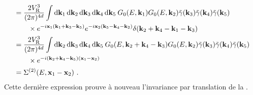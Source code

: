 \begin{align}
&=\frac{2V_{\mathrm{R}}^3}{(2\pi)^{4d}} \int{\mathop{}\mathopen{}\mathrm{d}\mathbf{k}_{\mathrm{1}}\mathop{}\mathopen{}\mathrm{d}\mathbf{k}_{\mathrm{2}}\mathop{}\mathopen{}\mathrm{d}\mathbf{k}_{\mathrm{3}}\mathop{}\mathopen{}\mathrm{d}\mathbf{k}_{\mathrm{4}}\mathop{}\mathopen{}\mathrm{d}\mathbf{k}_{\mathrm{5}}\: G_0(E,\mathbf{k}_{\mathrm{1}}) G_0(E,\mathbf{k}_{\mathrm{2}}) \tilde{\gamma}(\mathbf{k}_{\mathrm{3}})\tilde{\gamma}(\mathbf{k}_{\mathrm{4}})\tilde{\gamma}(\mathbf{k}_{\mathrm{5}})}\\
&\nonumber \qquad \times e^{-i\mathbf{x}_{\mathrm{1}} (\mathbf{k}_{\mathrm{1}}+\mathbf{k}_{\mathrm{3}}-\mathbf{k}_{\mathrm{5}})} e^{-i\mathbf{x}_{\mathrm{2}}(\mathbf{k}_{\mathrm{5}}-\mathbf{k}_{\mathrm{4}}-\mathbf{k}_{\mathrm{2}})} \delta(\mathbf{k}_{\mathrm{2}} +\mathbf{k}_{\mathrm{4}} -\mathbf{k}_{\mathrm{1}} -\mathbf{k}_{\mathrm{3}}) \\
&= \frac{2V_{\mathrm{R}}^3}{(2\pi)^{4d}} \int{\mathop{}\mathopen{}\mathrm{d}\mathbf{k}_{\mathrm{2}}\mathop{}\mathopen{}\mathrm{d}\mathbf{k}_{\mathrm{3}}\mathop{}\mathopen{}\mathrm{d}\mathbf{k}_{\mathrm{4}}\mathop{}\mathopen{}\mathrm{d}\mathbf{k}_{\mathrm{5}}\: G_0(E,\mathbf{k}_{\mathrm{2}}+\mathbf{k}_{\mathrm{4}}-\mathbf{k}_{\mathrm{3}}) G_0(E,\mathbf{k}_{\mathrm{2}})\tilde{\gamma}(\mathbf{k}_{\mathrm{3}})\tilde{\gamma}(\mathbf{k}_{\mathrm{4}})\tilde{\gamma}(\mathbf{k}_{\mathrm{5}})} \\
&\nonumber \qquad \times e^{-i(\mathbf{k}_{\mathrm{2}}+\mathbf{k}_{\mathrm{4}}-\mathbf{k}_{\mathrm{5}})(\mathbf{x}_{\mathrm{1}}-\mathbf{x}_{\mathrm{2}})}\\
&=\Sigma^{(2)}(E,\mathbf{x}_{\mathrm{1}}-\mathbf{x}_{\mathrm{2}}) \text{ .}
\end{align}
Cette dernière expression prouve à nouveau l'invariance par translation de la \selfenergy .

